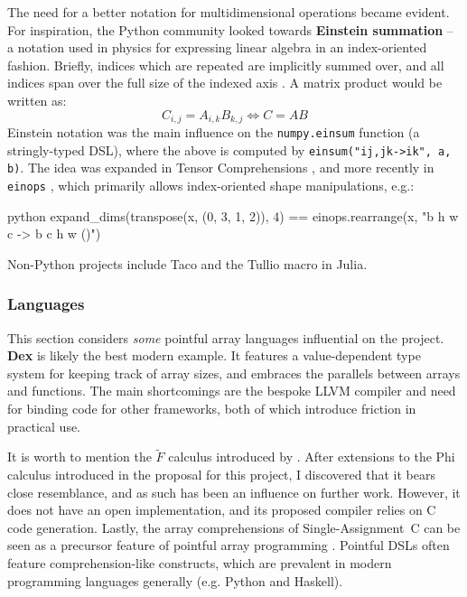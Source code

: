 The need for a better notation for multidimensional operations became evident. For inspiration, the Python community looked towards \textbf{Einstein summation} -- a notation used in physics for expressing linear algebra in an index-oriented fashion. Briefly, indices which are repeated are implicitly summed over, and all indices span over the full size of the indexed axis \cite{aahlander2002einstein}. A matrix product would be written as:
$$ C_{i,j} = A_{i,k} B_{k,j} \iff C = AB $$
Einstein notation was the main influence on the \texttt{numpy.einsum} function (a stringly-typed DSL), where the above is computed by \texttt{einsum("ij,jk->ik", a, b)}. The idea was expanded in Tensor Comprehensions \cite{vasilache2018tensor}, and more recently in \texttt{einops} \cite{rogozhnikov2021einops}, which primarily allows index-oriented shape manipulations, e.g.:
\begin{center}
\begin{cminted}{python}
expand_dims(transpose(x, (0, 3, 1, 2)), 4) == einops.rearrange(x, "b h w c -> b c h w ()")
\end{cminted}
\end{center}
Non-Python projects include Taco \cite{kjolstad2017tensor} and the Tullio macro in Julia.


\subsubsection{Languages}

This section considers \textit{some} pointful array languages influential on the project. \textbf{Dex} is likely the best modern example. It features a value-dependent type system for keeping track of array sizes, and embraces the parallels between arrays and functions. The main shortcomings are the bespoke LLVM compiler and need for binding code for other frameworks, both of which introduce friction in practical use.

It is worth to mention the $\tilde{F}$ calculus introduced by \textcite{shaikhha2019efficient}. After extensions to the Phi calculus introduced in the proposal for this project, I discovered that it bears close resemblance, and as such has been an influence on further work. However, it does not have an open implementation, and its proposed compiler relies on C code generation. Lastly, the array comprehensions of Single-Assignment~C can be seen as a precursor feature of pointful array programming \cite{scholz1994single}. Pointful DSLs often feature comprehension-like constructs, which are prevalent in modern programming languages generally (e.g. Python and Haskell). 


